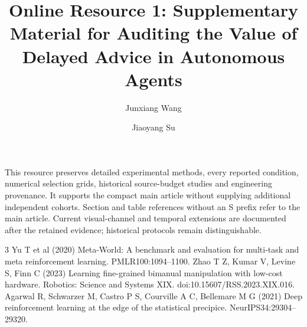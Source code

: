 \documentclass[smallextended]{svjour3}
\begin{document}
\title{Online Resource 1: Supplementary Material for Auditing the Value of Delayed Advice in Autonomous Agents}
\author{Junxiang Wang \and Jiaoyang Su}
\date{}\maketitle
This resource preserves detailed experimental methods, every reported condition, numerical selection grids, historical source-budget studies and engineering provenance. It supports the compact main article without supplying additional independent cohorts. Section and table references without an S prefix refer to the main article. Current visual-channel and temporal extensions are documented after the retained evidence; historical protocols remain distinguishable.



\begin{thebibliography}{3}
 Yu T et al (2020) Meta-World: A benchmark and evaluation for multi-task and meta reinforcement learning. PMLR100:1094--1100.
 Zhao T Z, Kumar V, Levine S, Finn C (2023) Learning fine-grained bimanual manipulation with low-cost hardware. Robotics: Science and Systems XIX. doi:10.15607/RSS.2023.XIX.016.
 Agarwal R, Schwarzer M, Castro P S, Courville A C, Bellemare M G (2021) Deep reinforcement learning at the edge of the statistical precipice. NeurIPS34:29304--29320.
\end{thebibliography}
\end{document}
